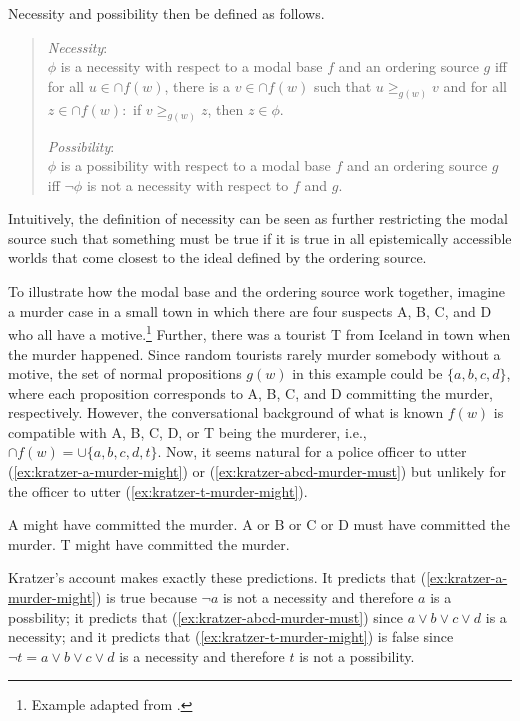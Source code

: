 Necessity and possibility then be defined as follows.
\begin{quote}
\noindent \textit{Necessity}: \\
$\phi$ is a necessity with respect to a modal base $f$ and an ordering source $g$ iff for all $u \in \cap f(w)$, there is a $v \in \cap f(w)$
such that $u \ge_{g(w)} v$ and for all $z \in \cap f(w):$ if $v \ge_{g(w)} z$, then $z \in \phi$.

\noindent \textit{Possibility}: \\
$\phi$ is a possibility with respect to a modal base $f$ and an ordering source $g$ iff $\lnot \phi$ is not a necessity with respect to $f$ and $g$.
\end{quote}
\noindent Intuitively, the definition of necessity can be seen as further restricting the modal source such that something must be true if it is true in 
all epistemically accessible worlds that come closest to the ideal defined by the ordering source. 

To illustrate how the modal base and the ordering source work together, imagine a murder case in a small town in which 
there are four suspects A, B, C, and D who all have a motive.\footnote{Example adapted from \cite{Kratzer2012Ch2}.} Further,
there was a tourist T from Iceland in town when the murder happened. Since random tourists rarely murder somebody without
a motive, the set of normal propositions $g(w)$ in this example could be $\{a, b, c, d\}$, where each proposition corresponds to
 A, B, C, and D committing the murder, respectively. 
However, the conversational background of what is known $f(w)$ is compatible with A, B, C, D, or T being the murderer,
i.e., $\cap f(w) = \cup \{a, b, c, d, t\}$. Now, it seems natural for a police officer to utter (\ref{ex:kratzer-a-murder-might})
or  (\ref{ex:kratzer-abcd-murder-must}) but unlikely for the officer to utter (\ref{ex:kratzer-t-murder-might}).

\begin{exe}
\ex \label{ex:kratzer-a-murder-might} A might have committed the murder.
\ex \label{ex:kratzer-abcd-murder-must} A or B or C or D must have committed the murder.
\ex \label{ex:kratzer-t-murder-might} T might have committed the murder.
\end{exe}

\noindent Kratzer's account makes exactly these predictions. It predicts that (\ref{ex:kratzer-a-murder-might}) is true because 
$\lnot a$ is not a necessity and therefore $a$ is a possbility; it predicts that (\ref{ex:kratzer-abcd-murder-must}) since 
$a \lor b \lor c \lor d$ is a necessity; and it  predicts that (\ref{ex:kratzer-t-murder-might}) is false since $\lnot t = a \lor b \lor c \lor d$ is a necessity
and therefore $t$ is not a possibility.

